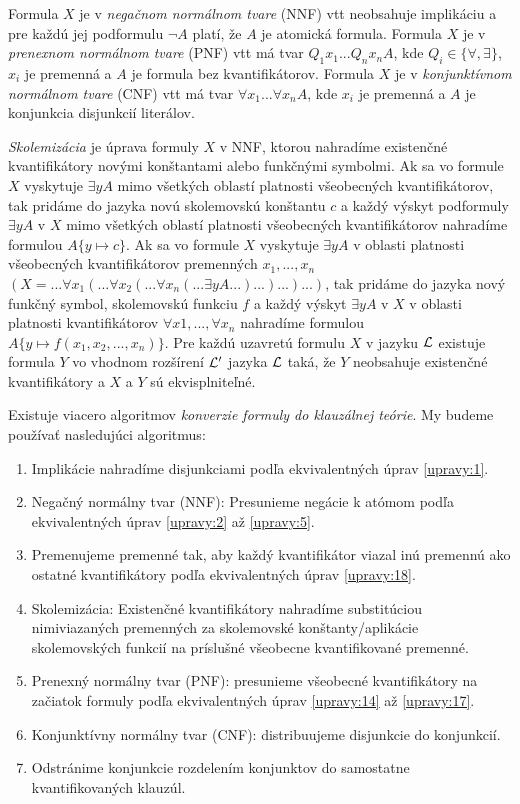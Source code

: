 Formula $X$ je v \emph{negačnom normálnom tvare} (NNF) vtt neobsahuje implikáciu a pre každú jej podformulu $\neg A$ platí, že $A$ je atomická formula.
Formula $X$ je v \emph{prenexnom normálnom tvare} (PNF) vtt má tvar $Q_1x_1 ... Q_nx_n A$, kde $Q_i \in \{\forall, \exists\}$, $x_i$ je premenná a $A$ je formula bez kvantifikátorov.
Formula $X$ je v \emph{konjunktívnom normálnom tvare} (CNF) vtt má tvar $\forall x_1 ... \forall x_n A$, kde $x_i$ je premenná a $A$ je konjunkcia disjunkcií literálov.

\emph{Skolemizácia} je úprava formuly $X$ v NNF, ktorou nahradíme existenčné kvantifikátory novými konštantami alebo funkčnými symbolmi.
Ak sa vo formule $X$ vyskytuje $\exists y A$ mimo všetkých oblastí platnosti všeobecných kvantifikátorov, tak pridáme do jazyka novú skolemovskú konštantu $c$ a každý výskyt podformuly $\exists y A$ v $X$ mimo všetkých oblastí platnosti všeobecných kvantifikátorov nahradíme formulou $A\{y \mapsto c\}$.
Ak sa vo formule $X$ vyskytuje $\exists y A$ v oblasti platnosti všeobecných kvantifikátorov premenných $x_1, ..., x_n$ $\left(X = ... \forall x_1(... \forall x_2(... \forall x_n(... \exists y A ...) ...) ...) ... \right)$, tak pridáme do jazyka nový funkčný symbol, skolemovskú funkciu $f$ a každý výskyt $\exists y A$ v $X$ v oblasti platnosti kvantifikátorov $\forall x1, ..., \forall x_n$ nahradíme formulou $A\{y \mapsto f(x_1, x_2, ..., x_n)\}$.
Pre každú uzavretú formulu $X$ v jazyku $\mathcal{L}$ existuje formula $Y$ vo vhodnom rozšírení $\mathcal{L}'$ jazyka $\mathcal{L}$ taká, že $Y$ neobsahuje existenčné kvantifikátory a $X$ a $Y$ sú ekvisplniteľné.

Existuje viacero algoritmov \emph{konverzie formuly do klauzálnej teórie}. My budeme používať nasledujúci algoritmus:
\begin{enumerate}
\item Implikácie nahradíme disjunkciami podľa ekvivalentných úprav \ref{upravy:1}.
\item Negačný normálny tvar (NNF): Presunieme negácie k atómom podľa ekvivalentných úprav \ref{upravy:2} až \ref{upravy:5}.
\item Premenujeme premenné tak, aby každý kvantifikátor viazal inú premennú ako ostatné kvantifikátory podľa ekvivalentných úprav \ref{upravy:18}.
\item Skolemizácia: Existenčné kvantifikátory nahradíme substitúciou nimiviazaných premenných za skolemovské konštanty/aplikácie skolemovských funkcií na príslušné všeobecne kvantifikované premenné.
\item Prenexný normálny tvar (PNF): presunieme všeobecné kvantifikátory na začiatok formuly podľa ekvivalentných úprav \ref{upravy:14} až \ref{upravy:17}.
\item Konjunktívny normálny tvar (CNF): distribuujeme disjunkcie do konjunkcií.
\item Odstránime konjunkcie rozdelením konjunktov do samostatne kvantifikovaných klauzúl.
\end{enumerate}

